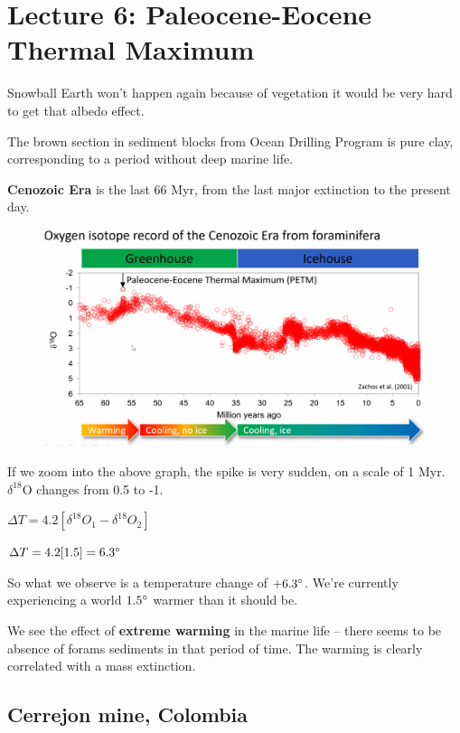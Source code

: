 \section{Lecture 6: Paleocene-Eocene Thermal Maximum}

Snowball Earth won't happen again because of vegetation it would be
very hard to get that albedo effect.

The brown section in sediment blocks from Ocean Drilling Program is pure clay,
corresponding to a period without deep marine life.

\textbf{Cenozoic Era} is the last 66 Myr, from the last major extinction to
the present day.

\begin{figure}[H]
    \centering
    \includegraphics[width=0.95\linewidth]
    {content/img/cenozoic_isotope_record_from_forams.png}
\end{figure}

If we zoom into the above graph, the spike is very sudden, on a scale of 1 Myr.
$\delta^{18}$O changes from 0.5 to -1.

$\Delta T = 4.2[\delta^{18}O_1 - \delta^{18}O_2]$

$\Delta T = 4.2[1.5] = 6.3 \degree$

So what we observe is a temperature change of $+6.3 \degree$. We're currently
experiencing a world $1.5 \degree$ warmer than it should be.

We see the effect of \textbf{extreme warming} in the marine life -- there seems
to be absence of forams sediments in that period of time. The warming is clearly
correlated with a mass extinction.

\subsection{Cerrejon mine, Colombia}

